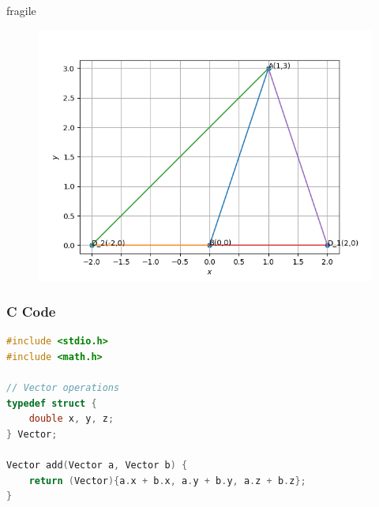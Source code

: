 \documentclass{beamer}
\theoremstyle{remark}
\numberwithin{equation}{section}
\begin{document}
\begin{frame}{fragile}
 \begin{figure}[H]
    \centering
    \includegraphics[width = 0.7\columnwidth]{../figs/img.png}
    \caption*{}
    \label{figs}
\end{figure}
\end{frame}
\begin{frame}[fragile]
\frametitle{C Code }
\begin{lstlisting}[language=C]
#include <stdio.h>
#include <math.h>

// Vector operations
typedef struct {
    double x, y, z;
} Vector;

Vector add(Vector a, Vector b) {
    return (Vector){a.x + b.x, a.y + b.y, a.z + b.z};
}

\end{lstlisting}
\end{frame}
\end{document}
